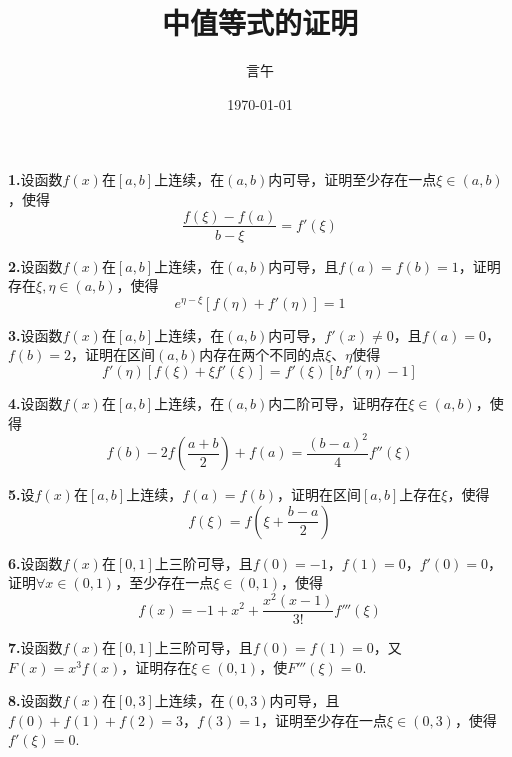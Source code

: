 \documentclass[10pt]{article}
\title{中值等式的证明}
\author{言午}
\date{\today}
\begin{document}
\maketitle

\textbf{1.}设函数$f\left( x \right)$在$\left[ a,b \right]$上连续，在$\left( a,b \right)$内可导，证明至少存在一点$\xi \in \left( a,b \right)$，使得
$$
\frac{f\left( \xi \right) -f\left( a \right)}{b-\xi}=f'\left( \xi \right)
$$

\textbf{2.}设函数$f\left( x \right)$在$\left[ a,b \right]$上连续，在$\left( a,b \right)$内可导，且$f\left( a \right) =f\left( b \right) =1$，证明存在$\xi ,\eta \in \left( a,b \right)$，使得
$$
e^{\eta -\xi}\left[ f\left( \eta \right) +f'\left( \eta \right) \right] =1
$$

\textbf{3.}设函数$f\left( x \right)$在$\left[ a,b \right]$上连续，在$\left( a,b \right)$内可导，$f'\left( x \right) \ne 0$，且$f\left( a \right) =0$，$f\left( b \right) =2$，证明在区间$\left( a,b \right)$内存在两个不同的点$\xi$、$\eta$使得
$$
f'\left( \eta \right) \left[ f\left( \xi \right) +\xi f'\left( \xi \right) \right] =f'\left( \xi \right) \left[ bf'\left( \eta \right) -1 \right]
$$

\textbf{4.}设函数$f\left( x \right)$在$\left[ a,b \right]$上连续，在$\left( a,b \right)$内二阶可导，证明存在$\xi \in \left( a,b \right)$，使得
$$
f\left( b \right) -2f\left( \frac{a+b}{2} \right) +f\left( a \right) =\frac{\left( b-a \right) ^2}{4}f''\left( \xi \right)
$$

\textbf{5.}设$f\left( x \right)$在$\left[ a,b \right]$上连续，$f\left( a \right) =f\left( b \right)$，证明在区间$\left[ a,b \right]$上存在$\xi$，使得
$$
f\left( \xi \right) =f\left( \xi +\frac{b-a}{2} \right)
$$

\textbf{6.}设函数$f\left( x \right)$在$\left[ 0,1 \right]$上三阶可导，且$f\left( 0 \right) =-1$，$f\left( 1 \right) =0$，$f'\left( 0 \right) =0$，证明$\forall x\in \left( 0,1 \right)$，至少存在一点$\xi \in \left( 0,1 \right)$，使得
$$
f\left( x \right) =-1+x^2+\frac{x^2\left( x-1 \right)}{3!}f'''\left( \xi \right)
$$

\textbf{7.}设函数$f\left( x \right)$在$\left[ 0,1 \right]$上三阶可导，且$f\left( 0 \right) =f\left( 1 \right) =0$，又$F\left( x \right) =x^3f\left( x \right)$，证明存在$\xi \in \left( 0,1 \right)$，使$F'''\left( \xi \right) =0$.

\textbf{8.}设函数$f\left( x \right)$在$\left[ 0,3 \right]$上连续，在$\left( 0,3 \right)$内可导，且$f\left( 0 \right) +f\left( 1 \right) +f\left( 2 \right) =3$，$f\left( 3 \right) =1$，证明至少存在一点$\xi \in \left( 0,3 \right)$，使得$f'\left( \xi \right) =0$.
\end{document}
